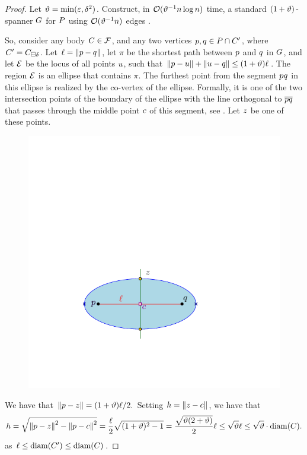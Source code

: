 \documentclass[12pt]{article}%
\begin{document}
\begin{proof}
    Let $\vartheta = \min( \varepsilon, \delta^2)$. Construct, in
    $\mathcal{O}(\vartheta^{-1} n \log n)$ time, a standard $(1+\vartheta)$-spanner $G$
    for $P$ using $\mathcal{O}( \vartheta^{-1} n)$ edges \cite{ams-dagss-99}.

    So, consider any body $C \in \mathcal{F}$, and any two vertices
    $p, q \in P \cap C'$, where
    $C'=C_{\boxminus \delta}$. Let $\ell = \left\| p - q \right\|$, 
    let $\pi$ be the shortest path between $p$ and $q$ in $G$, and let
    $\mathcal{E}$ be the locus of all points $u$, such that
    $\left\| p - u \right\| + \left\| u - q \right\| \leq (1+\vartheta) \ell$. The region
    $\mathcal{E}$ is an ellipse that contains $\pi$. The furthest point from
    the segment $pq$ in this ellipse is realized by the co-vertex
    of the ellipse. Formally, it is one of the two intersection points
    of the boundary of the ellipse with the line orthogonal to
    $\overline{p q}$ that passes through the middle point $c$ of this
    segment, see . Let $z$ be one of these points.

    \begin{figure}[h]
        \centerline{\includegraphics{figs/ellipse}}
        \caption{}
    \end{figure}

    We have that
    \begin{math}
        \left\| p - z \right\| = (1+\vartheta)\ell/2.
    \end{math}
    Setting $h = \left\| z - c \right\|$, we have that
    \begin{equation*}
        h%
        =%
        \sqrt{\dY{\pa}{\pz}^2 - \dY{\pa}{\cen}^2 }
        =%
        \frac{\ell}{2} \sqrt{(1+\epsA)^2 - 1}
        =%
        \frac{\sqrt{\epsA (2+\epsA)}}{2} \ell%
        \leq 
        \sqrt{\epsA} \ell
        \leq 
        \sqrt{\epsA}\cdot \diameterX{\body}.
    \end{equation*}
    as $\ell \leq \diameterX{\body'} \leq \diameterX{\body}$.


\end{proof}
\end{document}
